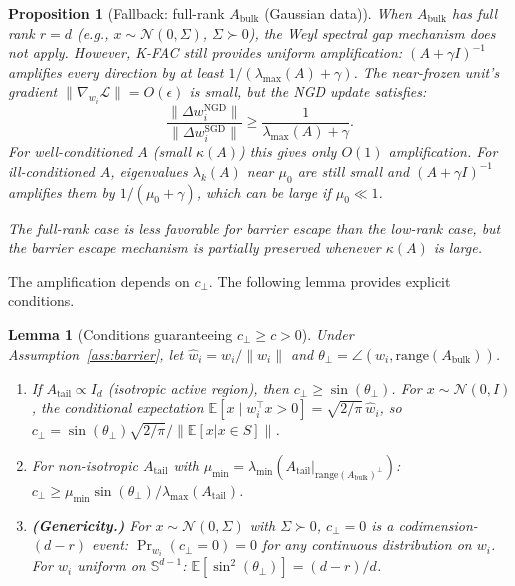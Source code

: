 \documentclass{article}
\providecommand{\E}{\mathbb{E}}
\providecommand{\norm}[1]{\lVert #1 \rVert}
\theoremstyle{plain}
\newtheorem{lemma}{Lemma}
\newtheorem{proposition}{Proposition}
\theoremstyle{definition}
\theoremstyle{remark}
\begin{document}
\begin{proposition}[Fallback: full-rank $A_{\mathrm{bulk}}$ (Gaussian data)]
\label{prop:fullrank_fallback}
When $A_{\mathrm{bulk}}$ has full rank $r = d$ (e.g., $x \sim \mathcal{N}(0, \Sigma)$, $\Sigma \succ 0$), the Weyl spectral gap mechanism does not apply. However, K-FAC still provides \emph{uniform} amplification: $(A + \gamma I)^{-1}$ amplifies every direction by at least $1/(\lambda_{\max}(A) + \gamma)$. The near-frozen unit's gradient $\norm{\nabla_{w_i}\mathcal{L}} = O(\epsilon)$ is small, but the NGD update satisfies:
\begin{equation}
    \frac{\norm{\Delta w_i^{\mathrm{NGD}}}}{\norm{\Delta w_i^{\mathrm{SGD}}}} \geq \frac{1}{\lambda_{\max}(A) + \gamma}.
\end{equation}
For well-conditioned $A$ (small $\kappa(A)$) this gives only $O(1)$ amplification. For ill-conditioned $A$, eigenvalues $\lambda_k(A)$ near $\mu_0$ are still small and $(A+\gamma I)^{-1}$ amplifies them by $1/(\mu_0 + \gamma)$, which can be large if $\mu_0 \ll 1$.

The full-rank case is less favorable for barrier escape than the low-rank case, but the barrier escape mechanism is partially preserved whenever $\kappa(A)$ is large.
\end{proposition}

The amplification depends on $c_\perp$. The following lemma provides explicit conditions.

\begin{lemma}[Conditions guaranteeing $c_\perp \geq c > 0$]
\label{lem:c_perp}
Under Assumption~\ref{ass:barrier}, let $\hat{w}_i = w_i/\norm{w_i}$ and $\theta_\perp = \angle(\hat{w}_i, \mathrm{range}(A_{\mathrm{bulk}}))$.
\begin{enumerate}
    \item[(i)] If $A_{\mathrm{tail}} \propto I_d$ (isotropic active region), then $c_\perp \geq \sin(\theta_\perp)$. For $x \sim \mathcal{N}(0, I)$, the conditional expectation $\E[x \mid w_i^\top x > 0] = \sqrt{2/\pi}\,\hat{w}_i$, so $c_\perp = \sin(\theta_\perp)\sqrt{2/\pi}/\norm{\E[x|x \in S]}$.
    \item[(ii)] For non-isotropic $A_{\mathrm{tail}}$ with $\mu_{\min} = \lambda_{\min}(A_{\mathrm{tail}}|_{\mathrm{range}(A_{\mathrm{bulk}})^\perp})$: $c_\perp \geq \mu_{\min}\sin(\theta_\perp) / \lambda_{\max}(A_{\mathrm{tail}})$.
    \item[(iii)] \textbf{(Genericity.)} For $x \sim \mathcal{N}(0, \Sigma)$ with $\Sigma \succ 0$, $c_\perp = 0$ is a codimension-$(d-r)$ event: $\Pr_{w_i}(c_\perp = 0) = 0$ for any continuous distribution on $w_i$. For $w_i$ uniform on $\mathbb{S}^{d-1}$: $\E[\sin^2(\theta_\perp)] = (d-r)/d$.
\end{enumerate}
\end{lemma}
\end{document}
